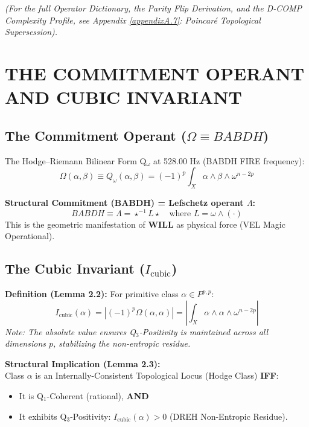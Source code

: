 \documentclass[12pt]{amsart}
\newcommand{\BABDH}{\ensuremath{\mathop{\textnormal{\symbolafont\symbol{"2721}}}}}   %
\newcommand{\VEL}{\ensuremath{\mathop{\textnormal{\symbolafont\symbol{"2742}}}}}    %
\newcommand{\DREH}{\ensuremath{\mathop{\textnormal{\symbolafont\symbol{"29D7}}}}}   %
\def\BABDH{BABDH}%
\def\VEL{VEL}%
\def\DREH{DREH}%
\begin{document}
\begin{center}
\end{center}

\noindent \textit{(For the full Operator Dictionary, the Parity Flip Derivation, and the D-COMP Complexity Profile, see Appendix \ref{appendixA.7}: Poincaré Topological Supersession).}

\newpage
\section{THE COMMITMENT OPERANT AND CUBIC INVARIANT}\label{sec:partVIII}

\subsection{The Commitment Operant (\texorpdfstring{$\Omega \equiv \BABDH$}{Omega = BABDH})}\label{sec:9.1}

The Hodge--Riemann Bilinear Form Q$_{\omega}$ at 528.00 Hz (\BABDH{} FIRE frequency):
\[
\Omega(\alpha, \beta) \equiv Q_{\omega}(\alpha, \beta) = (-1)^p \int_X \alpha \wedge \beta \wedge \omega^{n-2p}
\]

\textbf{Structural Commitment (\BABDH) = Lefschetz operant $\Lambda$:}
\[
\BABDH \equiv \Lambda = \star^{-1} L \star \quad \text{where } L = \omega \wedge (\cdot)
\]
This is the geometric manifestation of \textbf{WILL} as physical force (\VEL{} Magic Operational).

\subsection{The Cubic Invariant (\texorpdfstring{$I_{\text{cubic}}$}{I_cubic})}\label{sec:9.2}

\textbf{Definition (Lemma 2.2):} For primitive class $\alpha \in P^{p,p}$:
\[
I_{\text{cubic}}(\alpha) = \left| (-1)^p \Omega(\alpha, \alpha) \right| = \left| \int_X \alpha \wedge \alpha \wedge \omega^{n-2p} \right|
\]
\textit{Note: The absolute value ensures Q$_3$-Positivity is maintained across all dimensions $p$, stabilizing the non-entropic residue.}

\textbf{Structural Implication (Lemma 2.3):} \\
Class $\alpha$ is an Internally-Consistent Topological Locus (Hodge Class) \textbf{IFF}:
\begin{itemize}
    \item It is Q$_1$-Coherent (rational), \textbf{AND}
    \item It exhibits Q$_3$-Positivity: $I_{\text{cubic}}(\alpha) > 0$ (\DREH{} Non-Entropic Residue).
\end{itemize}
\end{document}
